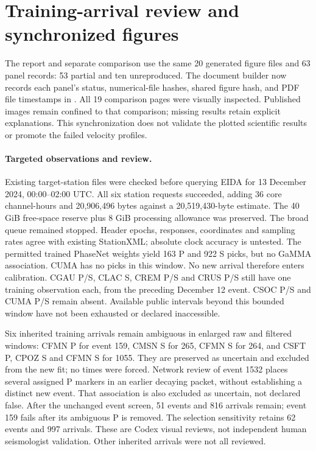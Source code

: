 \section{Training-arrival review and synchronized figures}
The report and separate comparison use the same 20 generated figure files and
63 panel records: 53 partial and ten unreproduced. The document builder now
records each panel's status, numerical-file hashes, shared figure hash, and PDF
file timestamps in . All 19 comparison pages
were visually inspected. Published images remain confined to that comparison;
missing results retain explicit explanations. This synchronization does not
validate the plotted scientific results or promote the failed velocity profiles.

\paragraph{Targeted observations and review.}
Existing target-station files were checked before querying EIDA for
13 December 2024, 00:00--02:00 UTC. All six station requests succeeded, adding
36 core channel-hours and 20,906,496 bytes against a 20,519,430-byte estimate.
The 40 GiB free-space reserve plus 8 GiB processing allowance was preserved.
The broad queue remained stopped. Header epochs, responses, coordinates and
sampling rates agree with existing StationXML; absolute clock accuracy is untested.
The permitted trained PhaseNet weights yield 163 P and 922 S picks, but no
GaMMA association. CUMA has no picks in this window. No new arrival therefore
enters calibration. CGAU P/S, CLAC S, CREM P/S and CRUS P/S still have one
training observation each, from the preceding December 12 event. CSOC P/S
and CUMA P/S remain absent. Available public intervals beyond this bounded
window have not been exhausted or declared inaccessible.

Six inherited training arrivals remain ambiguous in enlarged raw and filtered
windows: CFMN P for event 159, CMSN S for 265, CFMN S for 264, and CSFT P,
CPOZ S and CFMN S for 1055. They are preserved as uncertain and excluded from
the new fit; no times were forced. Network review of event 1532 places several
assigned P markers in an earlier decaying packet, without establishing a distinct
new event. That association is also excluded as uncertain, not declared false.
After the unchanged event screen, 51 events and 816 arrivals remain; event 159
fails after its ambiguous P is removed. The selection sensitivity retains
62 events and 997 arrivals. These are Codex visual reviews, not independent
human seismologist validation. Other inherited arrivals were not all reviewed.


